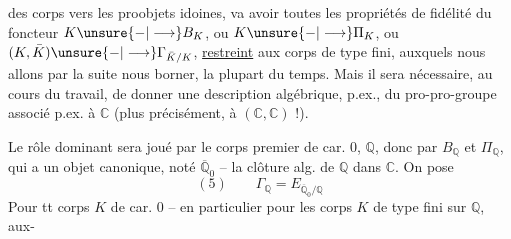 des corps vers les proobjets idoines, va avoir toutes les propriétés de fidélité du foncteur $K\unsure{-|\longrightarrow}B_K$, ou $K\unsure{-|\longrightarrow}\Pi_K$, ou $(K,\bar K)\unsure{-|\longrightarrow}\Gamma_{\bar K/K}$, \uline{restreint} aux corps  de type fini, auxquels nous allons par la suite nous borner, la plupart du temps. Mais il sera nécessaire, au cours du travail, de donner une description  algébrique, p.ex., du pro-pro-groupe  associé p.ex. à $\mathbb C$ (plus précisément, à $(\mathbb C,\mathbb C)$ !).

Le rôle dominant sera joué par le corps premier de car. $0$, $\mathbb Q$, donc par $B_{\mathbb Q}$ et $\Pi_{\mathbb Q}$, qui a un objet canonique, noté $\overline{\mathbb Q}_0$ -- la clôture alg. de $\mathbb Q$ dans $\mathbb C$. On pose
\[
(5)\qquad \Gamma_{\mathbb Q}=E_{\overline{\mathbb Q}_0/\mathbb Q}
\]
Pour tt corps $K$ de car. $0$ -- en particulier pour les corps $K$ de type fini sur $\mathbb Q$, aux-
